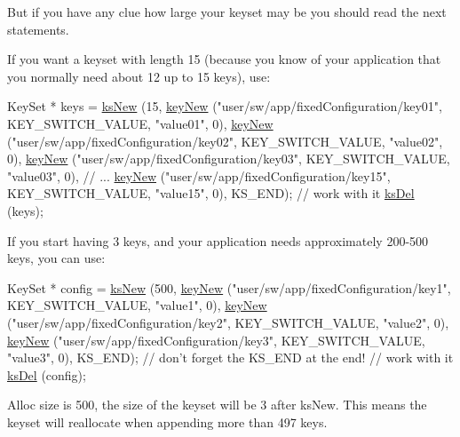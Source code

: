 But if you have any clue how large your keyset may be you should read the next statements.

If you want a keyset with length 15 (because you know of your application that you normally need about 12 up to 15 keys), use\-: 
\begin{DoxyCode}
KeySet * keys = \hyperlink{group__keyset_ga671e1aaee3ae9dc13b4834a4ddbd2c3c}{ksNew} (15,
        \hyperlink{group__key_gad23c65b44bf48d773759e1f9a4d43b89}{keyNew} (\textcolor{stringliteral}{"user/sw/app/fixedConfiguration/key01"}, KEY\_SWITCH\_VALUE,
       \textcolor{stringliteral}{"value01"}, 0),
        \hyperlink{group__key_gad23c65b44bf48d773759e1f9a4d43b89}{keyNew} (\textcolor{stringliteral}{"user/sw/app/fixedConfiguration/key02"}, KEY\_SWITCH\_VALUE,
       \textcolor{stringliteral}{"value02"}, 0),
        \hyperlink{group__key_gad23c65b44bf48d773759e1f9a4d43b89}{keyNew} (\textcolor{stringliteral}{"user/sw/app/fixedConfiguration/key03"}, KEY\_SWITCH\_VALUE,
       \textcolor{stringliteral}{"value03"}, 0),
        \textcolor{comment}{// ...}
        \hyperlink{group__key_gad23c65b44bf48d773759e1f9a4d43b89}{keyNew} (\textcolor{stringliteral}{"user/sw/app/fixedConfiguration/key15"}, KEY\_SWITCH\_VALUE,
       \textcolor{stringliteral}{"value15"}, 0),
        KS\_END);
\textcolor{comment}{// work with it}
\hyperlink{group__keyset_ga27e5c16473b02a422238c8d970db7ac8}{ksDel} (keys);
\end{DoxyCode}


If you start having 3 keys, and your application needs approximately 200-\/500 keys, you can use\-: 
\begin{DoxyCode}
KeySet * config = \hyperlink{group__keyset_ga671e1aaee3ae9dc13b4834a4ddbd2c3c}{ksNew} (500,
        \hyperlink{group__key_gad23c65b44bf48d773759e1f9a4d43b89}{keyNew} (\textcolor{stringliteral}{"user/sw/app/fixedConfiguration/key1"}, KEY\_SWITCH\_VALUE, \textcolor{stringliteral}{
      "value1"}, 0),
        \hyperlink{group__key_gad23c65b44bf48d773759e1f9a4d43b89}{keyNew} (\textcolor{stringliteral}{"user/sw/app/fixedConfiguration/key2"}, KEY\_SWITCH\_VALUE, \textcolor{stringliteral}{
      "value2"}, 0),
        \hyperlink{group__key_gad23c65b44bf48d773759e1f9a4d43b89}{keyNew} (\textcolor{stringliteral}{"user/sw/app/fixedConfiguration/key3"}, KEY\_SWITCH\_VALUE, \textcolor{stringliteral}{
      "value3"}, 0),
        KS\_END); \textcolor{comment}{// don't forget the KS\_END at the end!}
\textcolor{comment}{// work with it}
\hyperlink{group__keyset_ga27e5c16473b02a422238c8d970db7ac8}{ksDel} (config);
\end{DoxyCode}
 Alloc size is 500, the size of the keyset will be 3 after ks\-New. This means the keyset will reallocate when appending more than 497 keys.

